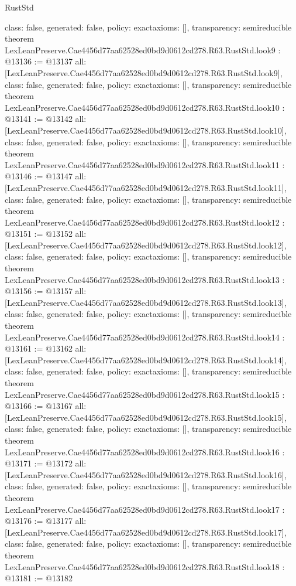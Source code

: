 \begin{lexlean}{RustStd}
\begin{coremodule}
{  class: false,
  generated: false,
  policy: exact{axioms: []},
  transparency: semireducible
}
theorem LexLeanPreserve.Cae4456d77aa62528ed0bd9d0612cd278.R63.RustStd.look9 : @13136 := @13137 {
  all: [LexLeanPreserve.Cae4456d77aa62528ed0bd9d0612cd278.R63.RustStd.look9],
  class: false,
  generated: false,
  policy: exact{axioms: []},
  transparency: semireducible
}
theorem LexLeanPreserve.Cae4456d77aa62528ed0bd9d0612cd278.R63.RustStd.look10 : @13141 := @13142 {
  all: [LexLeanPreserve.Cae4456d77aa62528ed0bd9d0612cd278.R63.RustStd.look10],
  class: false,
  generated: false,
  policy: exact{axioms: []},
  transparency: semireducible
}
theorem LexLeanPreserve.Cae4456d77aa62528ed0bd9d0612cd278.R63.RustStd.look11 : @13146 := @13147 {
  all: [LexLeanPreserve.Cae4456d77aa62528ed0bd9d0612cd278.R63.RustStd.look11],
  class: false,
  generated: false,
  policy: exact{axioms: []},
  transparency: semireducible
}
theorem LexLeanPreserve.Cae4456d77aa62528ed0bd9d0612cd278.R63.RustStd.look12 : @13151 := @13152 {
  all: [LexLeanPreserve.Cae4456d77aa62528ed0bd9d0612cd278.R63.RustStd.look12],
  class: false,
  generated: false,
  policy: exact{axioms: []},
  transparency: semireducible
}
theorem LexLeanPreserve.Cae4456d77aa62528ed0bd9d0612cd278.R63.RustStd.look13 : @13156 := @13157 {
  all: [LexLeanPreserve.Cae4456d77aa62528ed0bd9d0612cd278.R63.RustStd.look13],
  class: false,
  generated: false,
  policy: exact{axioms: []},
  transparency: semireducible
}
theorem LexLeanPreserve.Cae4456d77aa62528ed0bd9d0612cd278.R63.RustStd.look14 : @13161 := @13162 {
  all: [LexLeanPreserve.Cae4456d77aa62528ed0bd9d0612cd278.R63.RustStd.look14],
  class: false,
  generated: false,
  policy: exact{axioms: []},
  transparency: semireducible
}
theorem LexLeanPreserve.Cae4456d77aa62528ed0bd9d0612cd278.R63.RustStd.look15 : @13166 := @13167 {
  all: [LexLeanPreserve.Cae4456d77aa62528ed0bd9d0612cd278.R63.RustStd.look15],
  class: false,
  generated: false,
  policy: exact{axioms: []},
  transparency: semireducible
}
theorem LexLeanPreserve.Cae4456d77aa62528ed0bd9d0612cd278.R63.RustStd.look16 : @13171 := @13172 {
  all: [LexLeanPreserve.Cae4456d77aa62528ed0bd9d0612cd278.R63.RustStd.look16],
  class: false,
  generated: false,
  policy: exact{axioms: []},
  transparency: semireducible
}
theorem LexLeanPreserve.Cae4456d77aa62528ed0bd9d0612cd278.R63.RustStd.look17 : @13176 := @13177 {
  all: [LexLeanPreserve.Cae4456d77aa62528ed0bd9d0612cd278.R63.RustStd.look17],
  class: false,
  generated: false,
  policy: exact{axioms: []},
  transparency: semireducible
}
theorem LexLeanPreserve.Cae4456d77aa62528ed0bd9d0612cd278.R63.RustStd.look18 : @13181 := @13182 {
}
\end{coremodule}
\end{lexlean}
